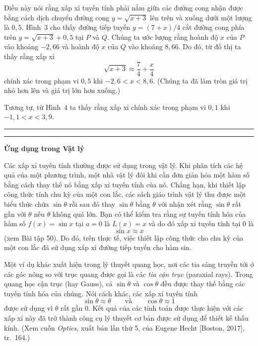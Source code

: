 \begin{minipage}[t]{0.70\textwidth}
  \vspace{0pt}
  \baselineskip=13.2pt
  \noindent
  Điều này nói rằng xấp xỉ tuyến tính phải nằm giữa các đường cong nhận được bằng cách dịch chuyển đường cong $y = \sqrt{x+3}$ lên trên và xuống dưới một lượng là $0{,}5$. Hình~3 cho thấy đường tiếp tuyến $y = (7+x)/4$ cắt đường cong phía trên $y = \sqrt{x+3}+0{,}5$ tại $P$ và $Q$. Chúng ta ước lượng rằng hoành độ $x$ của $P$ vào khoảng $-2{,}66$ và hoành độ $x$ của $Q$ vào khoảng $8{,}66$. Do đó, từ đồ thị ta thấy rằng xấp xỉ
  \[
    \sqrt{x+3} \approx \frac{7}{4} + \frac{x}{4}
  \]
  \noindent
  chính xác trong phạm vi $0{,}5$ khi $-2{,}6 < x < 8{,}6$. (Chúng ta đã làm tròn giá trị nhỏ hơn lên và giá trị lớn hơn xuống.)

  Tương tự, từ Hình~4 ta thấy rằng xấp xỉ chính xác trong phạm vi $0{,}1$ khi $-1{,}1 < x < 3{,}9$.
  \hfill{\color{stewartblue}\rule{1.2ex}{1.2ex}}

  \vspace{1.2em}
  \noindent
  {\color{stewartblue}\rule{1.3ex}{1.3ex}}\;\textsf{\textbf{Ứng dụng trong Vật lý}}

  \vspace{0.4em}
  \noindent
  Các xấp xỉ tuyến tính thường được sử dụng trong vật lý. Khi phân tích các hệ quả của một phương trình, một nhà vật lý đôi khi cần đơn giản hóa một hàm số bằng cách thay thế nó bằng xấp xỉ tuyến tính của nó. Chẳng hạn, khi thiết lập công thức tính chu kỳ của một con lắc, các sách giáo trình vật lý thu được một biểu thức chứa $\sin\theta$ rồi sau đó thay $\sin\theta$ bằng $\theta$ với nhận xét rằng $\sin\theta$ rất gần với $\theta$ nếu $\theta$ không quá lớn. Bạn có thể kiểm tra rằng sự tuyến tính hóa của hàm số $f(x) = \sin x$ tại $a = 0$ là $L(x) = x$ và do đó xấp xỉ tuyến tính tại $0$ là
  \[
    \sin x \approx x
  \]
  \noindent
  (xem Bài tập 50). Do đó, trên thực tế, việc thiết lập công thức cho chu kỳ của một con lắc đã sử dụng xấp xỉ đường tiếp tuyến cho hàm sin.

  Một ví dụ khác xuất hiện trong lý thuyết quang học, nơi các tia sáng truyền tới ở các góc nông so với trục quang được gọi là các \textit{tia cận trục} (paraxial rays). Trong quang học cận trục (hay Gauss), cả $\sin\theta$ và $\cos\theta$ đều được thay thế bằng các tuyến tính hóa của chúng. Nói cách khác, các xấp xỉ tuyến tính
  \[
    \sin\theta \approx \theta \qquad\text{và}\qquad \cos\theta \approx 1
  \]
  \noindent
  được sử dụng vì $\theta$ rất gần $0$. Kết quả của các tính toán được thực hiện với các xấp xỉ này đã trở thành công cụ lý thuyết cơ bản được sử dụng để thiết kế thấu kính. (Xem cuốn \textit{Optics}, xuất bản lần thứ 5, của Eugene Hecht [Boston, 2017], tr.~164.)


\end{minipage}

